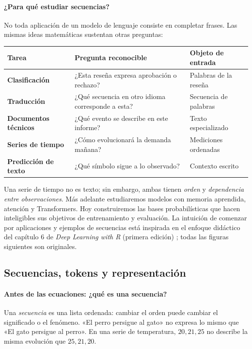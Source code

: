 \paragraph{¿Para qué estudiar secuencias?}
No toda aplicación de un modelo de lenguaje consiste en completar frases. Las mismas ideas matemáticas sustentan otras preguntas:
\begin{center}
\begin{tabularx}{\textwidth}{>{\bfseries}p{3.0cm}X>{\raggedright\arraybackslash}p{3.4cm}}
\toprule Tarea & Pregunta reconocible & Objeto de entrada\\\midrule
Clasificación & ¿Esta reseña expresa aprobación o rechazo? & Palabras de la reseña\\
Traducción & ¿Qué secuencia en otro idioma corresponde a esta? & Secuencia de palabras\\
Documentos técnicos & ¿Qué evento se describe en este informe? & Texto especializado\\
Series de tiempo & ¿Cómo evolucionará la demanda mañana? & Mediciones ordenadas\\
Predicción de texto & ¿Qué símbolo sigue a lo observado? & Contexto escrito\\\bottomrule
\end{tabularx}
\end{center}
Una serie de tiempo no es texto; sin embargo, ambas tienen \emph{orden} y \emph{dependencia entre observaciones}. Más adelante estudiaremos modelos con memoria aprendida, atención y Transformers. Hoy construiremos las bases probabilísticas que hacen inteligibles sus objetivos de entrenamiento y evaluación. La intuición de comenzar por aplicaciones y ejemplos de secuencias está inspirada en el enfoque didáctico del capítulo 6 de \emph{Deep Learning with R} (primera edición) \citep[cap.~6]{cholletallaire2018}; todas las figuras siguientes son originales.

\subsection{Secuencias, tokens y representación}\label{s01:cap:tokens}
\paragraph{Antes de las ecuaciones: ¿qué es una secuencia?}
Una \emph{secuencia} es una lista ordenada: cambiar el orden puede cambiar el significado o el fenómeno. «El perro persigue al gato» no expresa lo mismo que «El gato persigue al perro». En una serie de temperatura, $20,21,25$ no describe la misma evolución que $25,21,20$.

